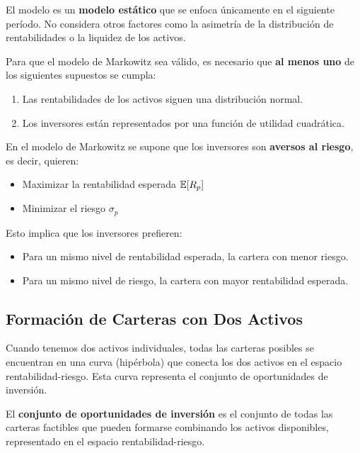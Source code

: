 El modelo es un \textbf{modelo estático} que se enfoca únicamente en el siguiente período. No considera otros factores como la asimetría de la distribución de rentabilidades o la liquidez de los activos.

\begin{proposicion}
Para que el modelo de Markowitz sea válido, es necesario que \textbf{al menos uno} de los siguientes supuestos se cumpla:
\begin{enumerate}
\item Las rentabilidades de los activos siguen una distribución normal.
\item Los inversores están representados por una función de utilidad cuadrática.
\end{enumerate}
\end{proposicion}

\begin{definicion}
En el modelo de Markowitz se supone que los inversores son \textbf{aversos al riesgo}, es decir, quieren:
\begin{itemize}
\item Maximizar la rentabilidad esperada $\mathbb{E}[R_p]$
\item Minimizar el riesgo $\sigma_p$
\end{itemize}
\end{definicion}

Esto implica que los inversores prefieren:
\begin{itemize}
\item Para un mismo nivel de rentabilidad esperada, la cartera con menor riesgo.
\item Para un mismo nivel de riesgo, la cartera con mayor rentabilidad esperada.
\end{itemize}

\subsection{Formación de Carteras con Dos Activos}

Cuando tenemos dos activos individuales, todas las carteras posibles se encuentran en una curva (hipérbola) que conecta los dos activos en el espacio rentabilidad-riesgo. Esta curva representa el conjunto de oportunidades de inversión.

\begin{definicion}
El \textbf{conjunto de oportunidades de inversión} es el conjunto de todas las carteras factibles que pueden formarse combinando los activos disponibles, representado en el espacio rentabilidad-riesgo.
\end{definicion}

